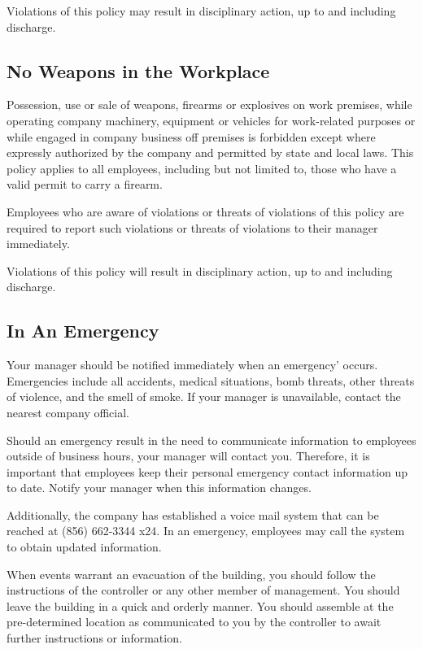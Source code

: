 Violations of this policy may result in disciplinary action, up to and including discharge.

\subsection{No Weapons in the Workplace}

Possession, use or sale of weapons, firearms or explosives on work premises, while operating company machinery, equipment or vehicles for work-related purposes or while engaged in company business off premises is forbidden except where expressly authorized by the company and permitted by state and local laws. This policy applies to all employees, including but not limited to, those who have a valid permit to carry a firearm.

Employees who are aware of violations or threats of violations of this policy are required to report such violations or threats of violations to their manager immediately.

Violations of this policy will result in disciplinary action, up to and including discharge.

\subsection{In An Emergency}

Your manager should be notified immediately when an emergency’ occurs. Emergencies include all accidents, medical situations, bomb threats, other threats of violence, and the smell of smoke. If your manager is unavailable, contact the nearest company official.

Should an emergency result in the need to communicate information to employees outside of business hours, your manager will contact you. Therefore, it is important that employees keep their personal emergency contact information up to date. Notify your manager when this information changes.

Additionally, the company has established a voice mail system that can be reached at (856) 662-3344 x24. In an emergency, employees may call the system to obtain updated information.

When events warrant an evacuation of the building, you should follow the instructions of the controller or any other member of management. You should leave the building in a quick and orderly manner. You should assemble at the pre-determined location as communicated to you by the controller to await further instructions or information.

